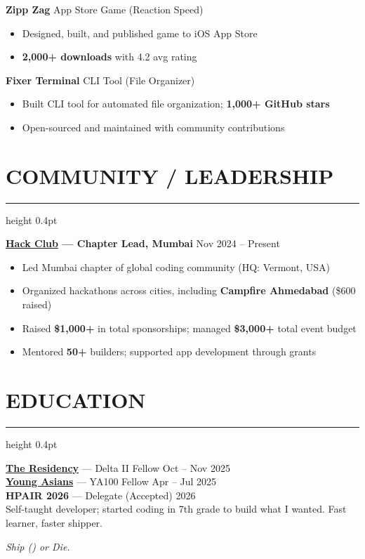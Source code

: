 \documentclass[11pt]{article}
\newcommand{\sectionheader}[1]{%
    \section*{#1}
    \vspace{-4pt}
    \hrule height 0.4pt
    \vspace{6pt}
}
\begin{document}
\noindent\textbf{Zipp Zag} \tabto{8cm} App Store Game (Reaction Speed) \\
\begin{itemize}
    \item Designed, built, and published game to iOS App Store
    \item \textbf{2,000+ downloads} with 4.2 avg rating
\end{itemize}
\vspace{4pt}

\noindent\textbf{Fixer Terminal} \tabto{8cm} CLI Tool (File Organizer) \\
\begin{itemize}
    \item Built CLI tool for automated file organization; \textbf{1,000+ GitHub stars}
    \item Open-sourced and maintained with community contributions
\end{itemize}
\vspace{8pt}

\sectionheader{COMMUNITY / LEADERSHIP}

\noindent\textbf{\href{https://hackclub.com}{Hack Club} --- Chapter Lead, Mumbai} \tabto{8cm} Nov 2024 -- Present \\
\begin{itemize}
    \item Led Mumbai chapter of global coding community (HQ: Vermont, USA)
    \item Organized hackathons across cities, including \textbf{Campfire Ahmedabad} (\$600 raised)
    \item Raised \textbf{\$1,000+} in total sponsorships; managed \textbf{\$3,000+} total event budget
    \item Mentored \textbf{50+} builders; supported app development through grants
\end{itemize}
\vspace{8pt}

\sectionheader{EDUCATION}

\noindent\textbf{\href{https://www.theresidency.io}{The Residency}} --- Delta II Fellow \tabto{8cm} Oct -- Nov 2025 \\
\noindent\textbf{\href{https://youngasians.org}{Young Asians}} --- YA100 Fellow \tabto{8cm} Apr -- Jul 2025 \\
\noindent\textbf{HPAIR 2026} --- Delegate (Accepted) \tabto{8cm} 2026 \\
\vspace{4pt}
\noindent Self-taught developer; started coding in 7th grade to build what I wanted. Fast learner, faster shipper.

\vfill
\begin{center}
\small \itshape Ship () or Die.
\end{center}
\end{document}

